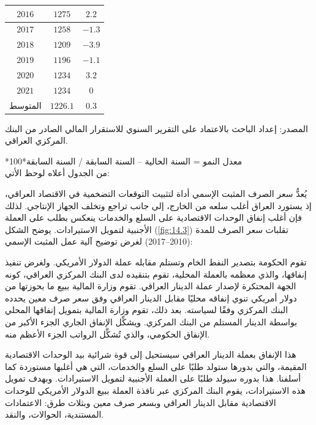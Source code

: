 \documentclass[10pt,a4paper]{report}
\begin{document}
\begin{doublespacing}
\begin{table}[H]
{\begin{tabular}{@{}|c|c|c|@{}}
				$2016$         & $1275$                              & $2.2$              \\ \midrule
				$2017$         & $1258$                              & $-1.3$             \\ \midrule
				$2018$         & $1209$                              & $-3.9$             \\ \midrule
				$2019$         & $1196$                              & $-1.1$             \\ \midrule
				$2020$         & $1234$                              & $3.2$              \\ \midrule
				$2021$         & $1234$                              & $0$                \\ \midrule
				المتوسط        & $1226.1$                            & $0.3$              \\ \bottomrule
			\end{tabular}%
		}
	\end{table}
المصدر: إعداد الباحث بالاعتماد على التقرير السنوي للاستقرار المالي الصادر من البنك المركزي العراقي.

*معدل النمو = السنة الحالية – السنة السابقة / السنة السابقة*100\\
من الجدول أعلاه لوحظ الأتي:

يُعدُّ سعر الصرف المثبت الإسمي أداة لتثبيت التوقعات التضخمية في الاقتصاد العراقي، إذ يستورد العراق أغلب سلعه من الخارج، إلى جانب تراجع وتخلف الجهاز الإنتاجي. لذلك فإن أغلب إنفاق الوحدات الاقتصادية على السلع والخدمات ينعكس بطلب على العملة الأجنبية لتمويل الاستيرادات. يوضح الشكل (\ref{fig:14.3}) تقلبات سعر الصرف للمدة (2010–2017) لغرض توضيح آلية عمل المثبت الإسمي:

تقوم الحكومة بتصدير النفط الخام وتستلم مقابله عملة الدولار الأمريكي. ولغرض تنفيذ إنفاقها، والذي معظمه بالعملة المحلية، تقوم بتنقيده لدى البنك المركزي العراقي، كونه الجهة المحتكرة لإصدار عملة الدينار العراقي. تقوم وزارة المالية ببيع ما بحوزتها من دولار أمريكي تنوي إنفاقه محليًا مقابل الدينار العراقي وفق سعر صرف معين يحدده البنك المركزي وفقًا لسياسته. بعد ذلك، تقوم وزارة المالية بتمويل إنفاقها المحلي بواسطة الدينار المستلم من البنك المركزي. ويشكِّل الإنفاق الجاري الجزء الأكبر من الإنفاق الحكومي، والذي تُشكِّل الرواتب الجزء الأعظم منه.

هذا الإنفاق بعملة الدينار العراقي سيستحيل إلى قوة شرائية بيد الوحدات الاقتصادية المقيمة، والتي بدورها ستولد طلبًا على السلع والخدمات، التي هي أغلبها مستوردة كما أسلفنا. هذا بدوره سيولد طلبًا على العملة الأجنبية لتمويل الاستيرادات. وبهدف تمويل هذه الاستيرادات، يقوم البنك المركزي عبر نافذة العملة ببيع الدولار الأمريكي للوحدات الاقتصادية مقابل الدينار العراقي وبسعر صرف معين وبثلاث طرق: الاعتمادات المستندية، الحوالات، والنقد.


\end{doublespacing}
\end{document}
